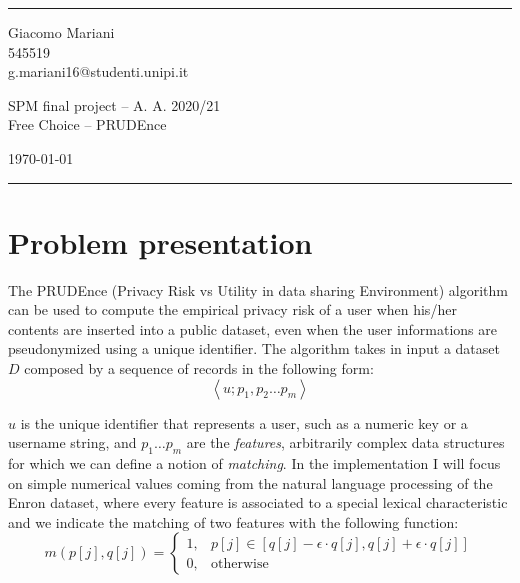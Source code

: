 \documentclass[a4paper]{article}
\begin{document}

\fancyhead[C]{}
\hrule \medskip %
\begin{minipage}{0.295\textwidth} 
\raggedright
\footnotesize
Giacomo Mariani \hfill\\   
545519 \hfill\\
g.mariani16@studenti.unipi.it
\end{minipage}
\begin{minipage}{0.4\textwidth} 
\centering 
\large 
SPM final project -- A. A. 2020/21\\ 
\normalsize 
Free Choice -- PRUDEnce \\ 
\end{minipage}
\begin{minipage}{0.295\textwidth} 
\raggedleft
\today\hfill\\
\end{minipage}
\medskip\hrule 
\bigskip


\section{Problem presentation}
The PRUDEnce (Privacy Risk vs Utility in data sharing Environment) algorithm can be used to compute the empirical privacy risk of a user when his/her contents are inserted into a public dataset, even when the user informations are pseudonymized using a unique identifier.
The algorithm takes in input a dataset $D$ composed by a sequence of records in the following form:
$$
    \left < u; p_1, p_2 \dots p_m \right >
$$

$u$ is the unique identifier that represents a user, such as a numeric key or a username string, and $p_1 \dots p_m$ are the \textit{features}, arbitrarily complex data structures for which we can define a notion of \textit{matching}. In the implementation I will focus on simple numerical values coming from the natural language processing of the Enron dataset, where every feature is associated to a special lexical characteristic and we indicate the matching of two features with the following function:
$$
    m(p[j], q[j]) = \begin{cases}
        1, & p[j] \in [q[j] - \epsilon \cdot q[j], q[j] + \epsilon \cdot q[j]]\\
        0, & \text{otherwise}
    \end{cases}
$$
\end{document}
